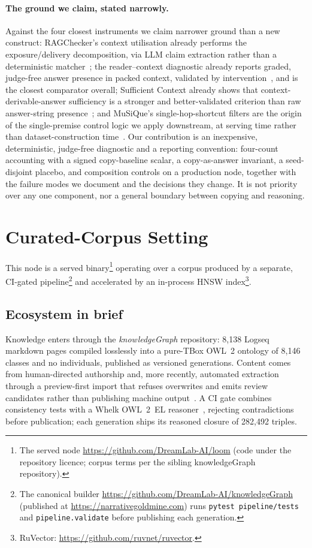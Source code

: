 \documentclass[10pt,twocolumn]{article}
\begin{document}
\paragraph{The ground we claim, stated narrowly.}
Against the four closest instruments we claim narrower ground than a new construct: RAGChecker's context utilisation already performs the exposure/delivery decomposition, via LLM claim extraction rather than a deterministic matcher~\cite{ragchecker2024}; the reader--context diagnostic already reports graded, judge-free answer presence in packed context, validated by intervention~\cite{readercontext2026}, and is the closest comparator overall; Sufficient Context already shows that context-derivable-answer sufficiency is a stronger and better-validated criterion than raw answer-string presence~\cite{sufficientcontext2025}; and MuSiQue's single-hop-shortcut filters are the origin of the single-premise control logic we apply downstream, at serving time rather than dataset-construction time~\cite{musique2022}. Our contribution is an inexpensive, deterministic, judge-free diagnostic and a reporting convention: four-count accounting with a signed copy-baseline scalar, a copy-as-answer invariant, a seed-disjoint placebo, and composition controls on a production node, together with the failure modes we document and the decisions they change. It is not priority over any one component, nor a general boundary between copying and reasoning.

\section{Curated-Corpus Setting}\label{sec:setting}
This node is a served binary\footnote{The served node \url{https://github.com/DreamLab-AI/loom} (code under the repository licence; corpus terms per the sibling knowledgeGraph repository).} operating over a corpus produced by a separate, CI-gated pipeline\footnote{The canonical builder \url{https://github.com/DreamLab-AI/knowledgeGraph} (published at \url{https://narrativegoldmine.com}) runs \texttt{pytest pipeline/tests} and \texttt{pipeline.validate} before publishing each generation.} and accelerated by an in-process HNSW index\footnote{RuVector: \url{https://github.com/ruvnet/ruvector}.}.

\subsection{Ecosystem in brief}\label{sec:ecosystem}
Knowledge enters through the \emph{knowledgeGraph} repository: 8{,}138 Logseq markdown pages compiled losslessly into a pure-TBox OWL~2 ontology of 8{,}146 classes and no individuals, published as versioned generations. Content comes from human-directed authorship and, more recently, automated extraction through a preview-first import that refuses overwrites and emits review candidates rather than publishing machine output~\cite{ontocast}. A CI gate combines consistency tests with a Whelk OWL~2~EL reasoner~\cite{whelk}, rejecting contradictions before publication; each generation ships its reasoned closure of 282{,}492 triples.
\end{document}
